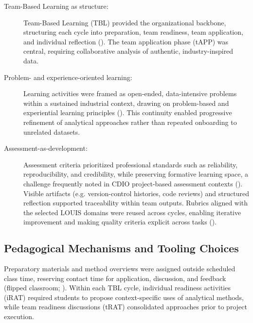 \begin{description}
  \item[Team-Based Learning as structure:] Team-Based Learning (TBL) provided the organizational backbone, structuring each cycle into preparation, team readiness, team application, and individual reflection (\cite{michaelsen2004team,fink2003creating,sibley2014getting}). The team application phase (tAPP) was central, requiring collaborative analysis of authentic, industry-inspired data.

  \item[Problem- and experience-oriented learning:] Learning activities were framed as open-ended, data-intensive problems within a sustained industrial context, drawing on problem-based and experiential learning principles (\cite{barrows1980problem,kolb1984experiential,Bruce2012}). This continuity enabled progressive refinement of analytical approaches rather than repeated onboarding to unrelated datasets.

  \item[Assessment-as-development:] Assessment criteria prioritized professional standards such as reliability, reproducibility, and credibility, while preserving formative learning space, a challenge frequently noted in CDIO project-based assessment contexts (\cite{hansen2023assessment}). 
  Visible artifacts (e.g. version-control histories, code reviews) and structured reflection supported traceability within team outputs. Rubrics aligned with the selected LOUIS domains were reused across cycles, enabling iterative improvement and making quality criteria explicit across tasks (\cite{biggs_constructive,wiggins2005understanding}).
\end{description}

\subsection{Pedagogical Mechanisms and Tooling Choices}

Preparatory materials and method overviews were assigned outside scheduled class time, reserving contact time for application, discussion, and feedback (flipped classroom; \cite{tucker2012flipped}). Within each TBL cycle, individual readiness activities (iRAT) required students to propose context-specific uses of analytical methods, while team readiness discussions (tRAT) consolidated approaches prior to project execution.


